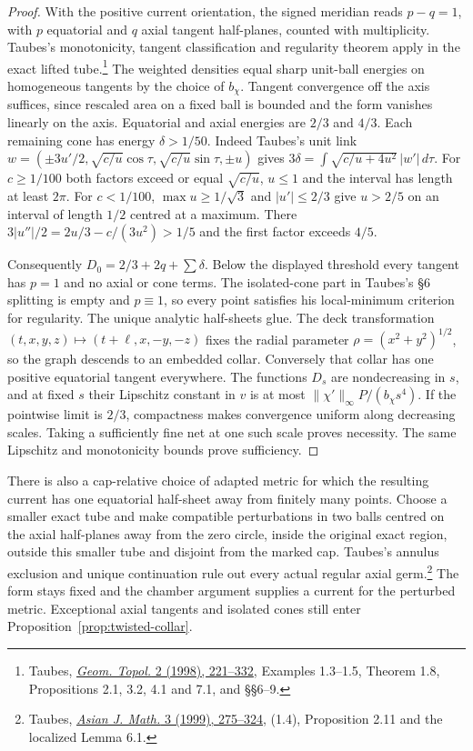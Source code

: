 \documentclass[11pt,letterpaper]{article}
\numberwithin{equation}{section}
\begin{document}
\begin{proof}
With the positive current orientation, the signed meridian reads
$p-q=1$, with $p$ equatorial and $q$ axial tangent half-planes, counted
with multiplicity. Taubes's monotonicity, tangent classification and
regularity theorem apply in the exact lifted tube.\footnote{Taubes,
\href{https://arxiv.org/pdf/math/9901142}{\emph{Geom. Topol.} 2 (1998),
221--332}, Examples 1.3--1.5, Theorem 1.8, Propositions 2.1, 3.2, 4.1
and 7.1, and \S\S6--9.}
The weighted densities equal sharp unit-ball energies on homogeneous
tangents by the choice of $b_\chi$. Tangent convergence off the axis
suffices, since rescaled area on a fixed ball is bounded and the form
vanishes linearly on the axis. Equatorial and axial energies are $2/3$
and $4/3$. Each remaining cone has energy $\delta>1/50$.
Indeed Taubes's unit link $w=(\pm3u'/2,\sqrt{c/u}\cos\tau,
\sqrt{c/u}\sin\tau,\pm u)$ gives
$3\delta=\int\sqrt{c/u+4u^2}\,|w'|\,d\tau$.
For $c\ge1/100$ both factors exceed or equal $\sqrt{c/u}$,
$u\le1$ and the interval has length at least $2\pi$.
For $c<1/100$, $\max u\ge1/\sqrt3$ and $|u'|\le2/3$ give
$u>2/5$ on an interval of length $1/2$ centred at a maximum.
There $3|u''|/2=2u/3-c/(3u^2)>1/5$ and the first factor exceeds $4/5$.

Consequently $D_0=2/3+2q+\sum\delta$. Below the displayed threshold
every tangent has $p=1$ and no axial or cone terms. The isolated-cone part in Taubes's \S6 splitting is empty and
$p\equiv1$, so every point satisfies his local-minimum criterion for regularity.
The unique analytic half-sheets glue. The deck transformation
$(t,x,y,z)\mapsto(t+\ell,x,-y,-z)$ fixes the radial parameter
$\rho=(x^2+y^2)^{1/2}$, so the graph descends to an embedded collar.
Conversely that collar has one positive equatorial tangent everywhere.
The functions $D_s$ are nondecreasing in $s$, and at fixed $s$ their
Lipschitz constant in $v$ is at most $\|\chi'\|_\infty P/(b_\chi s^4)$.
If the pointwise limit is $2/3$, compactness makes convergence uniform
along decreasing scales. Taking a sufficiently fine net at one such
scale proves necessity. The same Lipschitz and monotonicity bounds prove
sufficiency.
\end{proof}

There is also a cap-relative choice of adapted metric for which the
resulting current has one equatorial half-sheet away from finitely many
points. Choose a smaller exact tube and make compatible perturbations in
two balls centred on the axial half-planes away from the zero circle, inside the original exact region,
outside this smaller tube and disjoint from the marked cap. Taubes's annulus exclusion and
unique continuation rule out every actual regular axial germ.\footnote{Taubes,
\href{https://intlpress.com/site/pub/files/_fulltext/journals/ajm/1999/0003/0001/AJM-1999-0003-0001-a011.pdf}{\emph{Asian J. Math.} 3 (1999),
275--324}, (1.4), Proposition 2.11 and the localized Lemma 6.1.}
The form stays fixed and the chamber argument supplies a current for the
perturbed metric. Exceptional axial tangents and isolated cones still
enter Proposition~\ref{prop:twisted-collar}.
\end{document}
